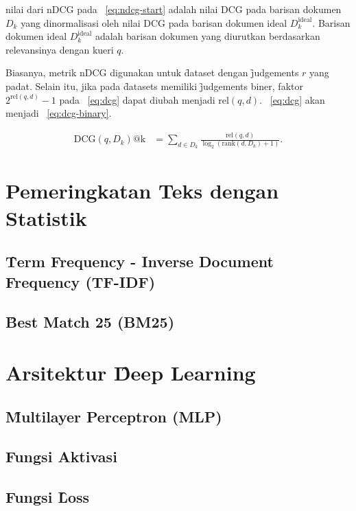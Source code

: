         nilai dari nDCG pada \equ~\ref{eq:ndcg-start} adalah nilai DCG pada barisan dokumen $D_k$ yang dinormalisasi oleh nilai DCG pada barisan dokumen ideal $D_k^{\text{ideal}}$. Barisan dokumen ideal $D_k^{\text{ideal}}$ adalah barisan dokumen yang diurutkan berdasarkan relevansinya dengan kueri $q$.

        Biasanya, metrik nDCG digunakan untuk \f{dataset} dengan \f{judgements} $r$ yang padat. Selain itu, jika pada \f{datasets} memiliki \f{judgements} biner, faktor $2^{\text{rel}(q, d)} - 1$ pada \equ~\ref{eq:dcg} dapat diubah menjadi $\text{rel}(q, d)$. \equ~\ref{eq:dcg} akan menjadi \equ~\ref{eq:dcg-binary}.
        
        \begin{align}
        \label{eq:dcg-binary}
        \text{DCG}(q, D_k)\text{@k} &= \sum_{d \in D_k} \frac{\text{rel}(q, d)}{\log_2(\text{rank}(d, D_k) + 1)}.
        \end{align}


\section{Pemeringkatan Teks dengan Statistik}

    \subsection{\f{Term Frequency - Inverse Document Frequency} (TF-IDF)}
    \subsection{\f{Best Match 25} (BM25)}


\section{Arsitektur \f{Deep Learning}}

    \subsection{\f{Multilayer Perceptron} (MLP)}

    \subsection{Fungsi Aktivasi}

    \subsection{Fungsi \f{Loss}}
        
